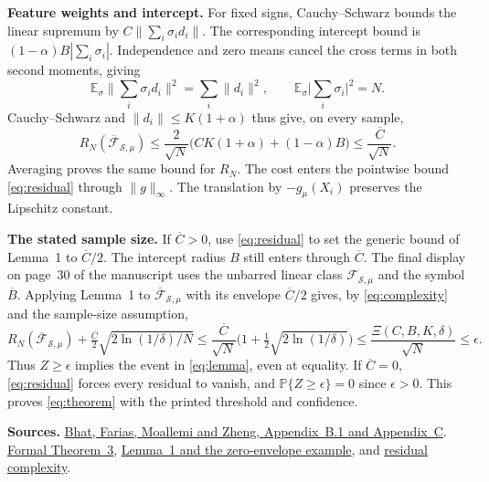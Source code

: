 \documentclass[12pt,a4paper]{article}
\newcommand{\E}{\mathbb E}
\newcommand{\Prob}{\mathbb P}
\newcommand{\Cbar}{\overline C}
\newcommand{\resclass}{\overline{\mathcal F}_{\!\mathcal S,\mu}}
\newcommand{\lead}[1]{\par\smallskip\noindent\textbf{#1}\enspace}
\begin{document}
\lead{Feature weights and intercept.}
For fixed signs, Cauchy--Schwarz bounds the linear supremum by
\(C\|\sum_i\sigma_i d_i\|\). The corresponding intercept bound is
\((1-\alpha)B|\sum_i\sigma_i|\). Independence and zero means cancel the
cross terms in both second moments, giving
\[
 \E_\sigma\Big\|\sum_i\sigma_i d_i\Big\|^2=\sum_i\|d_i\|^2,
 \qquad \E_\sigma\Big|\sum_i\sigma_i\Big|^2=N .
\]
Cauchy--Schwarz and \(\|d_i\|\le K(1+\alpha)\) thus give, on every sample,
\begin{equation}
 \widehat R_N(\resclass)
 \le \frac{2}{\sqrt N}\bigl(CK(1+\alpha)+(1-\alpha)B\bigr)
 \le \frac{\Cbar}{\sqrt N}.
 \tag{3}\label{eq:complexity}
\end{equation}
Averaging proves the same bound for \(R_N\). The cost enters the pointwise
bound \eqref{eq:residual} through \(\|g\|_\infty\). The translation by \(-g_\mu(X_i)\)
preserves the Lipschitz constant.

\lead{The stated sample size.}
If \(\Cbar>0\), use \eqref{eq:residual} to set the generic bound of Lemma~1 to
\(\Cbar/2\). The intercept radius \(B\) still enters through \(\Cbar\).
The final display on page~30 of the manuscript uses the unbarred linear
class \(\mathcal F_{\mathcal S,\mu}\) and the symbol \(\overline B\).
Applying Lemma~1 to \(\resclass\) with its envelope \(\Cbar/2\) gives,
by \eqref{eq:complexity} and the sample-size assumption,
\[
 R_N(\resclass)+\tfrac{\Cbar}{2}\sqrt{2\ln(1/\delta)/N}
 \le \frac{\Cbar}{\sqrt N}\bigl(1+\tfrac12\sqrt{2\ln(1/\delta)}\bigr)
 \le \frac{\Xi(C,B,K,\delta)}{\sqrt N}\le\epsilon .
\]
Thus \(Z\ge\epsilon\) implies the event in \eqref{eq:lemma}, even at
equality. If \(\Cbar=0\), \eqref{eq:residual} forces every residual to vanish,
and \(\Prob\{Z\ge\epsilon\}=0\) since \(\epsilon>0\).
This proves \eqref{eq:theorem} with the printed threshold and confidence.

{\small\textbf{Sources.}
\href{https://moallemi.com/ciamac/papers/kernel-adp-2012.pdf\#page=29}{Bhat, Farias, Moallemi and Zheng, Appendix~B.1 and Appendix~C}.
\href{https://github.com/nikhilpb/kadp/blob/main/Kadp/Theorem3.lean}{Formal Theorem~3},
\href{https://github.com/nikhilpb/kadp/blob/main/Kadp/OneSidedConcentration.lean}{Lemma~1 and the zero-envelope example}, and
\href{https://github.com/nikhilpb/kadp/blob/main/Kadp/ResidualComplexity.lean}{residual complexity}.}
\end{document}
